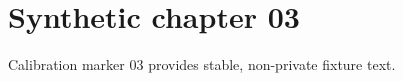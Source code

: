 \chapter{Synthetic chapter 03}\label{chap:03}
Calibration marker 03 provides stable, non-private fixture text.
